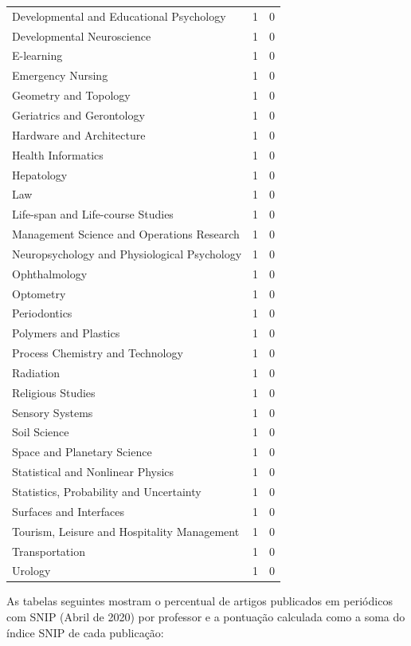 \documentclass[12pt,brazil]{article}\usepackage[]{graphicx}\usepackage[]{xcolor}
\makeatletter
\newenvironment{kframe}{%
 \def\at@end@of@kframe{}%
 \ifinner\ifhmode%
  \def\at@end@of@kframe{\end{minipage}}%
  \begin{minipage}{\columnwidth}%
 \fi\fi%
 \def\FrameCommand##1{\hskip\@totalleftmargin \hskip-\fboxsep
 \colorbox{shadecolor}{##1}\hskip-\fboxsep
     \hskip-\linewidth \hskip-\@totalleftmargin \hskip\columnwidth}%
 \MakeFramed {\advance\hsize-\width
   \@totalleftmargin\z@ \linewidth\hsize
   \@setminipage}}%
 {\par\unskip\endMakeFramed%
 \at@end@of@kframe}
\newcounter{tabela}
\makeatother
\begin{document}
\begin{longtable}{lrr}
Developmental and Educational Psychology & 1 & 0 \\
Developmental Neuroscience & 1 & 0 \\
E-learning & 1 & 0 \\
Emergency Nursing & 1 & 0 \\
Geometry and Topology & 1 & 0 \\
Geriatrics and Gerontology & 1 & 0 \\
Hardware and Architecture & 1 & 0 \\
Health Informatics & 1 & 0 \\
Hepatology & 1 & 0 \\
Law & 1 & 0 \\
Life-span and Life-course Studies & 1 & 0 \\
Management Science and Operations Research & 1 & 0 \\
Neuropsychology and Physiological Psychology & 1 & 0 \\
Ophthalmology & 1 & 0 \\
Optometry & 1 & 0 \\
Periodontics & 1 & 0 \\
Polymers and Plastics & 1 & 0 \\
Process Chemistry and Technology & 1 & 0 \\
Radiation & 1 & 0 \\
Religious Studies & 1 & 0 \\
Sensory Systems & 1 & 0 \\
Soil Science & 1 & 0 \\
Space and Planetary Science & 1 & 0 \\
Statistical and Nonlinear Physics & 1 & 0 \\
Statistics, Probability and Uncertainty & 1 & 0 \\
Surfaces and Interfaces & 1 & 0 \\
Tourism, Leisure and Hospitality Management & 1 & 0 \\
Transportation & 1 & 0 \\
Urology & 1 & 0 \\
\end{longtable}


\clearpage

As tabelas seguintes mostram o percentual de artigos publicados em periódicos
com SNIP (Abril de 2020) por professor e a pontuação
calculada como a soma do índice SNIP de cada publicação:

\begin{kframe}


{\ttfamily\noindent\bfseries\color{errorcolor}{\#\# Error in eval(expr, envir, enclos): objeto 'nSnip' não encontrado}}\end{kframe}
\end{document}
